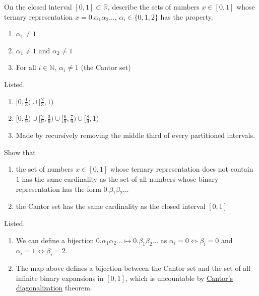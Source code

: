   \begin{exercise}[Zorich 2.4.7]
    On the closed interval $[0, 1] \subset \mathbb{R}$, describe the sets of numbers $x \in [0, 1]$ whose ternary representation $x = 0.\alpha_1 \alpha_2 \ldots $, $\alpha_i \in \{0, 1, 2\}$ has the property. 
    \begin{enumerate}
      \item $\alpha_1 \neq 1$
      \item $\alpha_1 \neq 1$ and $\alpha_2 \neq 1$ 
      \item For all $i \in \mathbb{N}$, $\alpha_i \neq 1$ (the Cantor set)
    \end{enumerate}
  \end{exercise}
  \begin{solution}
    Listed. 
    \begin{enumerate}
      \item $[0, \frac{1}{3}) \cup [\frac{2}{3}, 1)$ 
      \item $[0, \frac{1}{9}) \cup [\frac{2}{9}, \frac{3}{9}) \cup [\frac{6}{9}, \frac{7}{9}) \cup [\frac{8}{9}, 1)$
      \item Made by recursively removing the middle third of every partitioned intervals. 
    \end{enumerate}
  \end{solution}

  \begin{exercise}[Zorich 2.4.8]
    Show that 
    \begin{enumerate}
      \item the set of numbers $x \in [0, 1]$ whose ternary representation does not contain $1$ has the same cardinality as the set of all numbers whose binary representation has the form $0.\beta_1 \beta_2 \ldots$ 
      \item the Cantor set has the same cardinality as the closed interval $[0, 1]$ 
    \end{enumerate}
  \end{exercise}
  \begin{solution}
    Listed. 
    \begin{enumerate}
      \item We can define a bijection $0.\alpha_1 \alpha_2 \ldots \mapsto 0.\beta_1 \beta_2 \ldots$ as $\alpha_i = 0 \iff \beta_i = 0$ and $\alpha_i = 1 \iff \beta_i = 2$. 
      \item The map above defines a bijection between the Cantor set and the set of all infinite binary expansions in $[0, 1]$, which is uncountable by \hyperref[thm:cantors-diagonalization]{Cantor's diagonalization} theorem. 
    \end{enumerate}
  \end{solution}

